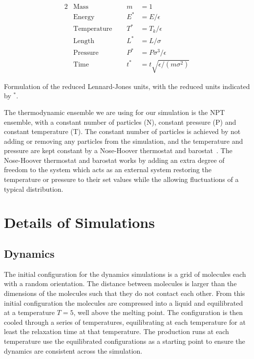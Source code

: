 \begin{table}
    \centering
    \begin{alignat*}{2}
        &\text{Mass} & m &= 1 \\
        &\text{Energy} & E^* &= E/\epsilon \\
        &\text{Temperature  }\quad& T^* &= T_k/\epsilon \\
        &\text{Length} & L^* &= L/\sigma \\
        &\text{Pressure} & P^* &= P\sigma^3/\epsilon \\
        &\text{Time} & t^* &= t\sqrt{\epsilon/(m\sigma^2)}
    \end{alignat*}
    \caption{Formulation of the reduced Lennard-Jones units, with the reduced units indicated by $^*$.}
    \label{tab:reduced units}
\end{table}


The thermodynamic ensemble we are using for our simulation is the NPT ensemble, with a constant number of particles (N), constant pressure (P) and constant temperature (T). The constant number of particles is achieved by not adding or removing any particles from the simulation, and the temperature and pressure are kept constant by a Nose-Hoover thermostat and barostat~\cite{nose:84,hoover:85}. The Nose-Hoover thermostat and barostat works by adding an extra degree of freedom to the system which acts as an external system restoring the temperature or pressure to their set values while the allowing fluctuations of a typical distribution.

\section{Details of Simulations}

\subsection{Dynamics}

The initial configuration for the dynamics simulations is a grid of molecules each with a random orientation. The distance between molecules is larger than the dimensions of the molecules such that they do not contact each other. From this initial configuration the molecules are compressed into a liquid and equilibrated at a temperature $T=5$, well above the melting point. The configuration is then cooled through a series of temperatures, equilibrating at each temperature for at least the relaxation time at that temperature. The production runs at each temperature use the equilibrated configurations as a starting point to ensure the dynamics are consistent across the simulation.

